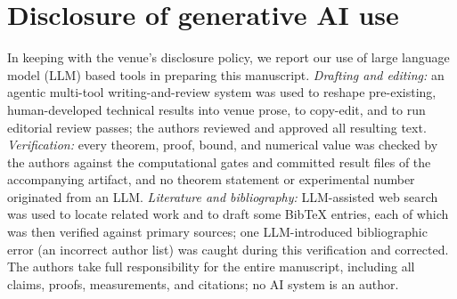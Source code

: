 \documentclass[sigconf,nonacm,anonymous,balance=false]{acmart}
\begin{document}
\section*{Disclosure of generative AI use}
In keeping with the venue's disclosure policy, we report our use of large language model
(LLM) based tools in preparing this manuscript. \emph{Drafting and editing:} an agentic
multi-tool writing-and-review system was used to reshape pre-existing, human-developed
technical results into venue prose, to copy-edit, and to run editorial review passes;
the authors reviewed and approved all resulting text. \emph{Verification:} every theorem,
proof, bound, and numerical value was checked by the authors against the computational
gates and committed result files of the accompanying artifact, and no theorem statement
or experimental number originated from an LLM. \emph{Literature and bibliography:}
LLM-assisted web search was used to locate related work and to draft some BibTeX entries,
each of which was then verified against primary sources; one LLM-introduced bibliographic
error (an incorrect author list) was caught during this verification and corrected. The
authors take full responsibility for the entire manuscript, including all claims, proofs,
measurements, and citations; no AI system is an author.



\end{document}
